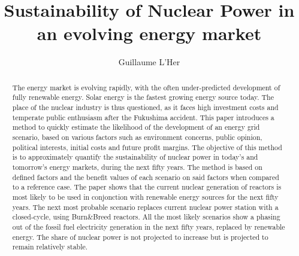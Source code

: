 \documentclass[IJPHM, 2017, 29]{PHMSociety}
\begin{document}
\renewcommand{\kbldelim}{[}%
\renewcommand{\kbrdelim}{]}%

\title{Sustainability of Nuclear Power in an evolving energy market}

\author{%
	Guillaume L'Her
}

\address{%
}

\maketitle
\pagestyle{fancy}
\thispagestyle{plain}



\begin{abstract}%
The energy market is evolving rapidly, with the often under-predicted development of fully renewable energy. Solar energy is the fastest growing energy source today. The place of the nuclear industry is thus questioned, as it faces high investment costs and temperate public enthusiasm after the Fukushima accident.
This paper introduces a method to quickly estimate the likelihood of the development of an energy grid scenario, based on various factors such as environment concerns, public opinion, political interests, initial costs and future profit margins. The objective of this method is to approximately quantify the sustainability of nuclear power in today's and tomorrow's energy markets, during the next fifty years.
The method is based on defined factors and the benefit values of each scenario on said factors when compared to a reference case. The paper shows that the current nuclear generation of reactors is most likely to be used in conjonction with renewable energy sources for the next fifty years. The next most probable scenario replaces current nuclear power station with a closed-cycle, using Burn\&Breed reactors.
All the most likely scenarios show a phasing out of the fossil fuel electricity generation in the next fifty years, replaced by renewable energy. The share of nuclear power is not projected to increase but is projected to remain relatively stable.
\end{abstract}
\end{document}
